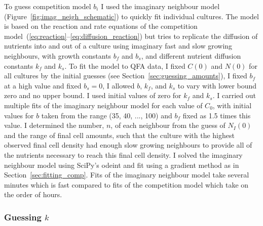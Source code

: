To guess competition model \(b_{i}\) I used the imaginary neighbour
model (Figure~\ref{fig:imag_neigh_schematic}) to quickly fit
individual cultures. The model is based on the reaction and rate
equations of the competition
model~(\ref{eq:reaction}--\ref{eq:diffusion_reaction}) but tries to
replicate the diffusion of nutrients into and out of a culture using
imaginary fast and slow growing neighbours, with growth constants
\(b_{f}\) and \(b_{s}\), and different nutrient diffusion constants
\(k_{f}\) and \(k_{s}\). To fit the model to QFA data, I fixed
\(C(0)\) and \(N(0)\) for all cultures by the initial guesses (see
Section~\ref{sec:guessing_amounts}), I fixed \(b_{f}\) at a high value
and fixed \(b_{s} = 0\), I allowed \(b\), \(k_{f}\), and \(k_{s}\) to
vary with lower bound zero and no upper bound. I used initial values
of zero for \(k_{f}\) and \(k_{s}\). I carried out multiple fits of
the imaginary neighbour model for each value of \(C_{0}\), with
initial values for \(b\) taken from the range (35, 40, ..., 100) and
\(b_{f}\) fixed as 1.5 times this value. I determined the number,
\(n\), of each neighbour from the guess of \(N_{I}(0)\) and the range
of final cell amounts, such that the culture with the highest observed
final cell density had enough slow growing neighbours to provide all
of the nutrients necessary to reach this final cell density. I solved
the imaginary neighbour model using SciPy's odeint and fit using a
gradient method as in Section~\ref{sec:fitting_comp}. Fits of the
imaginary neighbour model take several minutes which is fast compared
to fits of the competition model which take on the order of hours.


\subsubsection{\boldmath Guessing \(k\) \unboldmath}


